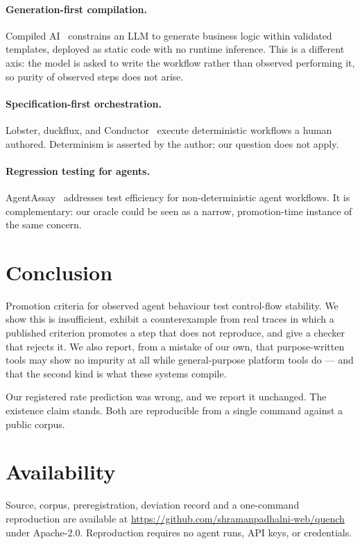 \documentclass[10pt,conference]{article}
\begin{document}
\paragraph{Generation-first compilation.} Compiled AI~\cite{compiledai2026}
constrains an LLM to generate business logic within validated templates,
deployed as static code with no runtime inference. This is a different axis:
the model is asked to write the workflow rather than observed performing it, so
purity of observed steps does not arise.

\paragraph{Specification-first orchestration.} Lobster, duckflux, and
Conductor~\cite{conductor2026} execute deterministic workflows a human authored.
Determinism is asserted by the author; our question does not apply.

\paragraph{Regression testing for agents.} AgentAssay~\cite{agentassay2026}
addresses test efficiency for non-deterministic agent workflows. It is
complementary: our oracle could be seen as a narrow, promotion-time instance of
the same concern.

\section{Conclusion}

Promotion criteria for observed agent behaviour test control-flow stability. We
show this is insufficient, exhibit a counterexample from real traces in which a
published criterion promotes a step that does not reproduce, and give a checker
that rejects it. We also report, from a mistake of our own, that purpose-written
tools may show no impurity at all while general-purpose platform tools do ---
and that the second kind is what these systems compile.

Our registered rate prediction was wrong, and we report it unchanged. The
existence claim stands. Both are reproducible from a single command against a
public corpus.

\section*{Availability}

Source, corpus, preregistration, deviation record and a one-command reproduction
are available at \url{https://github.com/shramanpadhalni-web/quench} under Apache-2.0.
Reproduction requires no agent runs, API keys, or credentials.
\end{document}
